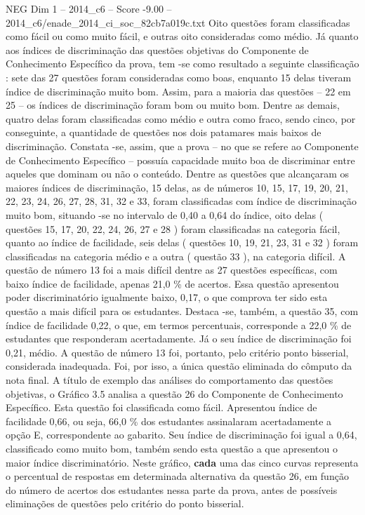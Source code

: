 \begin{textsample}{NEG Dim 1 – 2014\_c6 – Score -9.00 – 2014\_c6/enade\_2014\_ci\_soc\_82cb7a019c.txt}
Oito questões foram classificadas como fácil ou como muito fácil, e outras oito consideradas como médio.
Já quanto aos índices de discriminação das questões objetivas do Componente de Conhecimento Específico da prova, tem -se como resultado a seguinte classificação : sete das 27 questões foram consideradas como boas, enquanto 15 delas tiveram índice de discriminação muito bom.
Assim, para a maioria das questões – 22 em 25 – os índices de discriminação foram bom ou muito bom.
Dentre as demais, quatro delas foram classificadas como médio e outra como fraco, sendo cinco, por conseguinte, a quantidade de questões nos dois patamares mais baixos de discriminação.
Constata -se, assim, que a prova – no que se refere ao Componente de Conhecimento Específico – possuía capacidade muito boa de discriminar entre aqueles que dominam ou não o conteúdo.
Dentre as questões que alcançaram os maiores índices de discriminação, 15 delas, as de números 10, 15, 17, 19, 20, 21, 22, 23, 24, 26, 27, 28, 31, 32 e 33, foram classificadas com índice de discriminação muito bom, situando -se no intervalo de 0,40 a 0,64 do índice, oito delas ( questões 15, 17, 20, 22, 24, 26, 27 e 28 ) foram classificadas na categoria fácil, quanto ao índice de facilidade, seis delas ( questões 10, 19, 21, 23, 31 e 32 ) foram classificadas na categoria médio e a outra ( questão 33 ), na categoria difícil.
A questão de número 13 foi a mais difícil dentre as 27 questões específicas, com baixo índice de facilidade, apenas 21,0 \% de acertos.
Essa questão apresentou poder discriminatório igualmente baixo, 0,17, o que comprova ter sido esta questão a mais difícil para os estudantes.
Destaca -se, também, a questão 35, com índice de facilidade 0,22, o que, em termos percentuais, corresponde a 22,0 \% de estudantes que responderam acertadamente.
Já o seu índice de discriminação foi 0,21, médio.
A questão de número 13 foi, portanto, pelo critério ponto bisserial, considerada inadequada.
Foi, por isso, a única questão eliminada do cômputo da nota final.
A título de exemplo das análises do comportamento das questões objetivas, o Gráfico 3.5 analisa a questão 26 do Componente de Conhecimento Específico.
Esta questão foi classificada como fácil.
Apresentou índice de facilidade 0,66, ou seja, 66,0 \% dos estudantes assinalaram acertadamente a opção E, correspondente ao gabarito.
Seu índice de discriminação foi igual a 0,64, classificado como muito bom, também sendo esta questão a que apresentou o maior índice discriminatório.
Neste gráfico, \textbf{cada} uma das cinco curvas representa o percentual de respostas em determinada alternativa da questão 26, em função do número de acertos dos estudantes nessa parte da prova, antes de possíveis eliminações de questões pelo critério do ponto bisserial.

\end{textsample}
